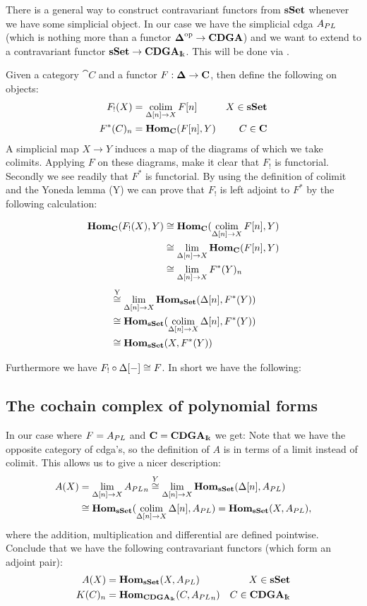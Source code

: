 
There is a general way to construct contravariant functors from $\mathbf{s{\mathbf{Set}}}$ whenever we have some simplicial object. In our case we have the simplicial cdga ${A_{PL}}$ (which is nothing more than a functor ${\boldsymbol{\Delta}}^{\text{op}} \to \mathbf{CDGA}$) and we want to extend to a contravariant functor $\mathbf{s{\mathbf{Set}}} \to \mathbf{CDGA}_{\mathrm{I\!k}}$. This will be done via .

Given a category $\cat{C}$ and a functor $F: \boldsymbol{\Delta} \to \mathbf{C}$, then define the following on objects:
\begin{align*}
	F_!(X)      &= \operatorname*{colim}_{\Delta[n] \to X} F[n] & X \in \mathbf{s{\mathbf{Set}}} \\
	F^\ast(C)_n &= \mathbf{Hom}_{\mathbf{C}}(F[n], Y)       & C \in \mathbf{C}
\end{align*}
A simplicial map $X \to Y$ induces a map of the diagrams of which we take colimits. Applying $F$ on these diagrams, make it clear that $F_!$ is functorial. Secondly we see readily that $F^\ast$ is functorial. By using the definition of colimit and the Yoneda lemma (Y) we can prove that $F_!$ is left adjoint to $F^\ast$ by the following calculation:

\begin{align*}
	\mathbf{Hom}_{\mathbf{C}}(F_!(X), Y)
	&\cong \mathbf{Hom}_{\mathbf{C}}(\operatorname*{colim}_{\Delta[n] \to X} F[n], Y) \\
	&\cong \lim_{\Delta[n] \to X} \mathbf{Hom}_{\mathbf{C}}(F[n], Y) \\
	&\cong \lim_{\Delta[n] \to X} F^\ast(Y)_n
\end{align*}
\begin{align*}
	&\stackrel{\text{Y}}{\cong} \lim_{\Delta[n] \to X} \mathbf{Hom}_{\mathbf{s{\mathbf{Set}}}}(\Delta[n], F^\ast(Y)) \\
	&\cong \mathbf{Hom}_{\mathbf{s{\mathbf{Set}}}}(\operatorname*{colim}_{\Delta[n] \to X} \Delta[n], F^\ast(Y)) \\
	&\cong \mathbf{Hom}_{\mathbf{s{\mathbf{Set}}}}(X, F^\ast(Y))
\end{align*}

Furthermore we have $F_! \circ \Delta[-] \cong F$. In short we have the following:


\subsection{The cochain complex of polynomial forms}
In our case where $F = {A_{PL}}$ and $\mathbf{C} = \mathbf{CDGA}_{\mathrm{I\!k}}$ we get:
Note that we have the opposite category of cdga's, so the definition of $A$ is in terms of a limit instead of colimit. This allows us to give a nicer description:
\begin{align*}
	A(X)
	&= \lim_{\Delta[n] \to X} {A_{PL}}_n 
	\stackrel{Y}{\cong} \lim_{\Delta[n] \to X} \mathbf{Hom}_{\mathbf{s{\mathbf{Set}}}}(\Delta[n], {A_{PL}}) \\
	&\cong \mathbf{Hom}_{\mathbf{s{\mathbf{Set}}}}(\operatorname*{colim}_{\Delta[n] \to X}\Delta[n], {A_{PL}})
	= \mathbf{Hom}_{\mathbf{s{\mathbf{Set}}}}(X, {A_{PL}}),
\end{align*}
where the addition, multiplication and differential are defined pointwise. Conclude that we have the following contravariant functors (which form an adjoint pair):
\begin{align*}
	A(X) &= \mathbf{Hom}_{\mathbf{s{\mathbf{Set}}}}(X, {A_{PL}}) & X \in \mathbf{s{\mathbf{Set}}} \\
	K(C)_n &= \mathbf{Hom}_{\mathbf{CDGA}_{\mathrm{I\!k}}}(C, {A_{PL}}_n) & C \in \mathbf{CDGA}_{\mathrm{I\!k}}
\end{align*}


